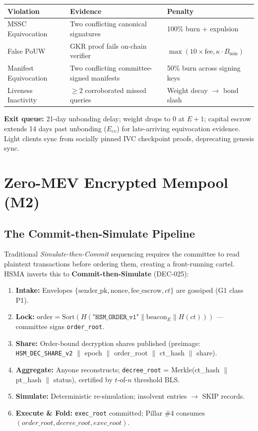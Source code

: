 \documentclass[11pt, a4paper]{article}
\begin{document}
\begin{center}
\begin{tabular}{l|l|l}
\textbf{Violation} & \textbf{Evidence} & \textbf{Penalty} \\
\hline
MSSC Equivocation & Two conflicting canonical signatures & 100\% burn + expulsion \\
False PoUW & GKR proof fails on-chain verifier & $\max(10 \times \text{fee}, \kappa \cdot B_{\min})$ \\
Manifest Equivocation & Two conflicting committee-signed manifests & 50\% burn across signing keys \\
Liveness Inactivity & $\ge 2$ corroborated missed queries & Weight decay $\to$ bond slash \\
\end{tabular}
\end{center}

\textbf{Exit queue:} 21-day unbonding delay; weight drops to 0 at $E+1$; capital escrow extends 14 days past unbonding ($E_{ev}$) for late-arriving equivocation evidence. Light clients sync from socially pinned IVC checkpoint proofs, deprecating genesis sync.

\section{Zero-MEV Encrypted Mempool (M2)}

\subsection{The Commit-then-Simulate Pipeline}

Traditional \textit{Simulate-then-Commit} sequencing requires the committee to read plaintext transactions before ordering them, creating a front-running cartel. HSMA inverts this to \textbf{Commit-then-Simulate} (DEC-025):

\begin{enumerate}
    \item \textbf{Intake:} Envelopes $\{\text{sender\_pk}, \text{nonce}, \text{fee\_escrow}, ct\}$ are gossiped (G1 class P1).
    \item \textbf{Lock:} $\text{order} = \text{Sort}(H(\texttt{"HSM\_ORDER\_v1"} \| \text{beacon}_E \| H(ct)))$ --- committee signs \texttt{order\_root}.
    \item \textbf{Share:} Order-bound decryption shares published (preimage: \texttt{HSM\_DEC\_SHARE\_v2} $\|$ epoch $\|$ order\_root $\|$ ct\_hash $\|$ share).
    \item \textbf{Aggregate:} Anyone reconstructs; \texttt{decree\_root} = Merkle(ct\_hash $\|$ pt\_hash $\|$ status), certified by $t$-of-$n$ threshold BLS.
    \item \textbf{Simulate:} Deterministic re-simulation; insolvent entries $\to$ SKIP records.
    \item \textbf{Execute \& Fold:} \texttt{exec\_root} committed; Pillar \#4 consumes $(order\_root, decree\_root, exec\_root)$.
\end{enumerate}
\end{document}
